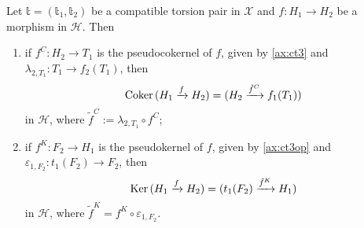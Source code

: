 \begin{prop}\label{prop:1.3}
  Let $\mathbb{t}=(\mathbb{t}_1,\mathbb{t}_2)$ be a compatible torsion pair in $\mathcal{X}$ and
  $f:H_1\to H_2$ be a morphism in $\mathcal{H}$. Then
  \begin{enumerate}[label=(\alph*)]
    \item\label{prop:1.3:a} if $f^C:H_2\to T_1$ is the pseudocokernel of $f$, given by \ref{ax:ct3}
    and $\lambda_{2,T_1}:T_1\to f_2(T_1)$, then
    \begin{equation*}
      \mathrm{\textup{Coker\,}}(H_1\xrightarrow{f}H_2) = (H_2\xrightarrow{\tilde{f}^C}f_1(T_1))
    \end{equation*}
    in $\mathcal{H}$, where $\tilde{f}^C:=\lambda_{2,T_1}\circ f^C$;
    \item\label{prop:1.3:b} if $f^K:F_2\to H_1$ is the pseudokernel of $f$, given by \ref{ax:ct3op}%
    and $\varepsilon_{1,F_2}:t_1(F_2)\to F_2$, then
    \begin{equation*}
      \mathrm{\textup{Ker\,}}(H_1\xrightarrow{f} H_2) = (t_1(F_2)\xrightarrow{\tilde{f}^K}H_1)
    \end{equation*}
    in $\mathcal{H}$, where $\tilde{f}^K=f^K\circ \varepsilon_{1,F_2}$.
  \end{enumerate}
\end{prop}

%
